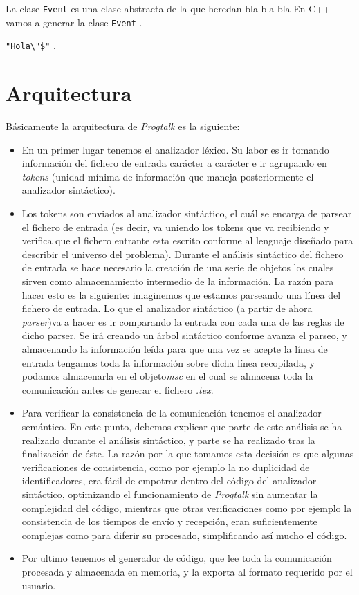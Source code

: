 \documentclass[12pt,a4paper]{report}
\begin{document}
La clase \lstinline{Event} es una clase abstracta de la que heredan bla bla bla En C++ vamos a generar la clase \lstinline[style=code,language=C++]{Event} .

\verb~"Hola\"$"~ .


\section{Arquitectura}

Básicamente la arquitectura de \textit{Progtalk} es la siguiente:
\begin{itemize}
\item En un primer lugar tenemos el analizador léxico. Su labor es ir tomando información del fichero de entrada carácter a carácter e ir agrupando en \textit{tokens} (unidad mínima de información que maneja posteriormente el analizador sintáctico).
\item Los tokens son enviados al analizador sintáctico, el cuál se encarga de parsear el fichero de entrada (es decir, va uniendo los tokens que va recibiendo y verifica que el fichero entrante esta escrito conforme al lenguaje diseñado para describir el universo del problema).
Durante el análisis sintáctico del fichero de entrada se hace necesario la creación de una serie de objetos los cuales sirven como almacenamiento intermedio de la información. La razón para hacer esto es la siguiente: imaginemos que estamos parseando una línea del fichero de entrada. Lo que el analizador sintáctico (a partir de ahora \textit{parser})va a hacer es ir comparando la entrada con cada una de las reglas de dicho parser. Se irá creando un árbol sintáctico conforme avanza el parseo, y almacenando la información leída para que una vez se acepte la línea de entrada tengamos toda la información sobre dicha línea recopilada, y podamos almacenarla en el objeto\textit{msc} en el cual se almacena toda la comunicación antes de generar el fichero \textit{.tex}.

\item Para verificar la consistencia de la comunicación tenemos el analizador semántico. En este punto, debemos explicar que parte de este análisis se ha realizado durante el análisis sintáctico, y parte se ha realizado tras la finalización de éste. La razón por la que tomamos esta decisión es que algunas verificaciones de consistencia, como por ejemplo la no duplicidad de identificadores, era fácil de empotrar dentro del código del analizador sintáctico, optimizando el funcionamiento de \textit{Progtalk} sin aumentar la complejidad del código, mientras que otras verificaciones como por ejemplo la consistencia de los tiempos de envío y recepción, eran suficientemente complejas como para diferir su procesado, simplificando así mucho el código.
\item Por ultimo tenemos el generador de código, que lee toda la comunicación procesada y almacenada en memoria, y la exporta al formato requerido por el usuario.
\end{itemize}
\end{document}
